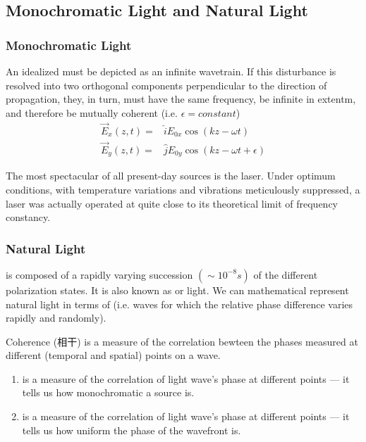\subsection{Monochromatic Light and Natural Light}

\subsubsection{Monochromatic Light}
An idealized  must be depicted as an infinite wavetrain. If this disturbance is resolved into two orthogonal components perpendicular to the direction of propagation, they, in turn, must have the same frequency, be infinite in extentm, and therefore be mutually coherent (i.e. $\epsilon=constant$)
\begin{align*}
    \vec{E}_x(z,t)=&\hat{i}E_{0x}\cos(kz-\omega t)\\
    \vec{E}_y(z,t)=&\hat{j}E_{0y}\cos(kz-\omega t+\epsilon)
\end{align*}

The most spectacular of all present-day sources is the laser. Under optimum conditions, with temperature variations and vibrations meticulously suppressed, a laser was actually operated at quite close to its theoretical limit of frequency constancy. 

\subsubsection{Natural Light}
 is composed of a rapidly varying succession $(\sim 10^{-8}s)$ of the different polarization states. It is also known as  or  light. We can mathematical represent natural light in terms of  (i.e. waves for which the relative phase difference varies rapidly and randomly). 

Coherence (相干) is a measure of the correlation bewteen the phases measured at different (temporal and spatial) points on a wave. 
\begin{enumerate}
    \item {} is a measure of the correlation of light wave's phase at different points  --- it tells us how monochromatic a source is. 
    \item {} is a measure of the correlation of light wave's phase at different points  --- it tells us how uniform the phase of the wavefront is. 
\end{enumerate}

